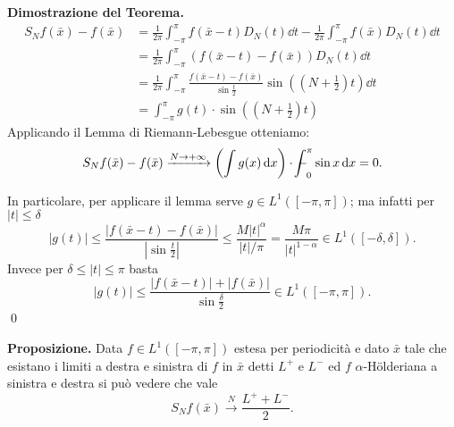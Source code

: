 \textbf{Dimostrazione del Teorema.}
\begin{align*}
	S_N f(\bar x) - f(\bar x) 
	&= \frac{1}{2\pi} \int_{-\pi}^\pi f(\bar x - t) D_N(t) \dd t - \frac{1}{2\pi} \int_{-\pi}^\pi f(\bar x) D_N(t) \dd t \\
	&= \frac{1}{2\pi} \int_{-\pi}^\pi (f(\bar x - t) - f(\bar x)) D_N(t) \dd t \\
	&= \frac{1}{2\pi} \int_{-\pi}^\pi \frac{f(\bar x - t) - f(\bar x)}{\sin \frac{t}{2}} \sin \left(\left(N + \frac{1}{2}\right) t\right) \dd t \\
	&= \int_{-\pi}^\pi g(t) \cdot \sin \left(\left(N + \frac{1}{2}\right) t\right)
\end{align*}
Applicando il Lemma di Riemann-Lebesgue otteniamo:
%
$$
	S_N f(\bar{x}) - f(\bar{x}) \xrightarrow{N \to +\infty} \left(\int g(x) \dd x\right) \cdot \avint_0^\pi \sin x \dd x = 0.
$$
%

In particolare, per applicare il lemma serve $g \in L^1([-\pi, \pi])$; ma infatti per $|t| \leq \delta$
$$
	|g(t)| \leq \frac{|f(\bar x - t) - f(\bar x)|}{|\sin \frac{t}{2}|} \leq \frac{M |t|^\alpha}{|t| / \pi} = \frac{M \pi}{|t|^{1 - \alpha}} \in L^1([-\delta, \delta]).
$$
Invece per $\delta \leq |t| \leq \pi$ basta
$$
	|g(t)| \leq \frac{|f(\bar x - t)| + |f(\bar x)|}{\sin \frac{\delta}{2}} \in L^1([-\pi, \pi]).
$$
\qed

\textbf{Proposizione.} Data $f \in L^1([-\pi, \pi])$ estesa per periodicità e dato $\bar x$ tale che esistano i limiti a destra e sinistra di $f$ in $\bar x$ detti $L^+$ e $L^-$ ed $f$ $\alpha$-H\"olderiana a sinistra e destra si può vedere che vale
$$
	S_N f(\bar x) \xrightarrow{N} \frac{L^+ + L^-}{2}.
$$
